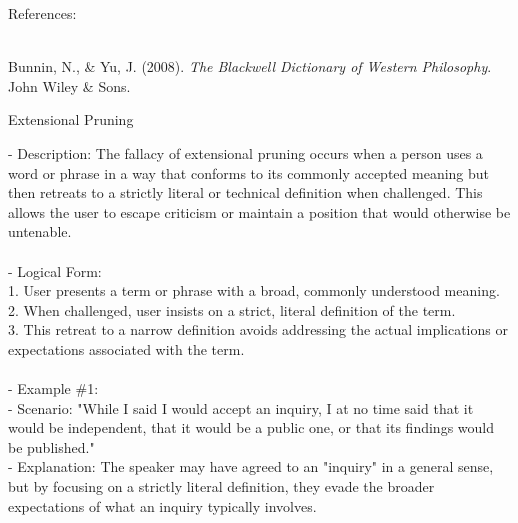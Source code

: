 \documentclass[a4paper,12pt,single,pdftex]{scrbook}
\begin{document}
    References:

    
      
        
      \\

      
        
          Bunnin, N., \& Yu, J. (2008). {\it The Blackwell Dictionary of Western Philosophy}. John Wiley \& Sons.
        
      
    
  

Extensional Pruning
    
      - Description: The fallacy of extensional pruning occurs when a person uses a word or phrase in a way that conforms to its commonly accepted meaning but then retreats to a strictly literal or technical definition when challenged. This allows the user to escape criticism or maintain a position that would otherwise be untenable.
    \\

    
      
    \\

    
      - Logical Form:
    \\

    
        1. User presents a term or phrase with a broad, commonly understood meaning.
    \\

    
        2. When challenged, user insists on a strict, literal definition of the term.
    \\

    
        3. This retreat to a narrow definition avoids addressing the actual implications or expectations associated with the term.
    \\

    
      
    \\

    
      - Example \#1:
    \\

    
        - Scenario: "While I said I would accept an inquiry, I at no time said that it would be independent, that it would be a public one, or that its findings would be published."
    \\

    
        - Explanation: The speaker may have agreed to an "inquiry" in a general sense, but by focusing on a strictly literal definition, they evade the broader expectations of what an inquiry typically involves.
    \\
\end{document}
